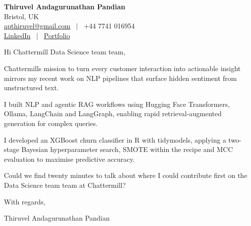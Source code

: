 \documentclass[11pt,a4paper]{article}
\begin{document}
\raggedright
\pagestyle{empty}

\begin{center}
    {\LARGE \color{linkblue} \textbf{Thiruvel Andagurunathan Pandian}}\\[0.2cm]
    Bristol, UK \\
    \href{mailto:apthiruvel@gmail.com}{apthiruvel@gmail.com} \ $|$ \ +44 7741 016954 \\
\href{https://www.linkedin.com/in/thiruvel-a-p/}{LinkedIn} \ $|$ \ \href{https://thiruvel-ap.github.io/PersonalPortfolio/}{Portfolio}
\end{center}

\vspace{0.4cm}

\noindent
Hi Chattermill Data Science team team,

Chattermill\textquotesingle{}s mission to turn every customer interaction into actionable insight mirrors my recent work on NLP pipelines that surface hidden sentiment from unstructured text.

I built NLP and agentic RAG workflows using Hugging Face Transformers, Ollama, LangChain and LangGraph, enabling rapid retrieval-augmented generation for complex queries.

I developed an XGBoost churn classifier in R with tidymodels, applying a two-stage Bayesian hyperparameter search, SMOTE within the recipe and MCC evaluation to maximise predictive accuracy.

Could we find twenty minutes to talk about where I could contribute first on the Data Science team team at Chattermill?

\vspace{0.5cm}

With regards,

Thiruvel Andagurunathan Pandian
\end{document}
